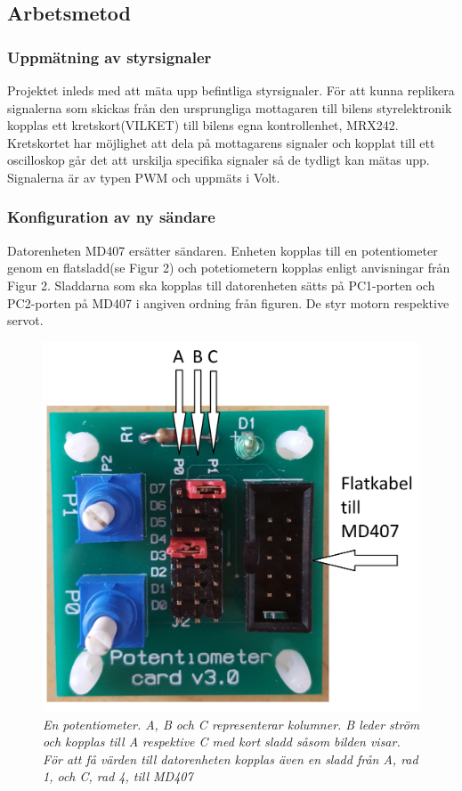 \documentclass[a4paper]{article}
\begin{document}
\subsection{Arbetsmetod}
\subsubsection{Uppmätning av styrsignaler}
Projektet inleds med att mäta upp befintliga styrsignaler. För att kunna replikera signalerna som skickas från den ursprungliga mottagaren till bilens styrelektronik kopplas ett kretskort(VILKET) till bilens egna kontrollenhet, MRX242. Kretskortet har möjlighet att dela på mottagarens signaler och kopplat till ett oscilloskop går det att urskilja specifika signaler så de tydligt kan mätas upp. Signalerna är av typen PWM och uppmäts i Volt. 


\subsubsection{Konfiguration av ny sändare}
\vspace{5mm} \noindent
Datorenheten MD407 ersätter sändaren. Enheten kopplas till en potentiometer genom en flatsladd(se Figur 2) och potetiometern kopplas enligt anvisningar från Figur 2. Sladdarna som ska kopplas till datorenheten sätts på PC1-porten och PC2-porten på MD407 i angiven ordning från figuren. De styr motorn respektive servot. 




\begin{figure}[H]
\includegraphics[scale=0.05]{PotentiometerMedRitning.jpg}
\centering
\caption{\it En potentiometer. A, B och C representerar kolumner. B leder ström och kopplas till A respektive C med kort sladd såsom bilden visar. För att få värden till datorenheten kopplas även en sladd från A, rad 1, och C, rad 4, till MD407}
\end{figure} 
\end{document}
